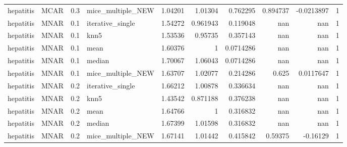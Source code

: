 \begin{table}[ht]
\begin{tabular}{llrlrrrrrr}
 hepatitis       & MCAR        &         0.3 & mice\_multiple\_NEW &       1.04201  &             1.01304  &              0.762295  &                         0.894737 &                     -0.0213897 &         1 \\
 hepatitis       & MNAR        &         0.1 & iterative\_single  &       1.54272  &             0.961943 &              0.119048  &                       nan        &                    nan         &         1 \\
 hepatitis       & MNAR        &         0.1 & knn5              &       1.53536  &             0.95735  &              0.357143  &                       nan        &                    nan         &         1 \\
 hepatitis       & MNAR        &         0.1 & mean              &       1.60376  &             1        &              0.0714286 &                       nan        &                    nan         &         1 \\
 hepatitis       & MNAR        &         0.1 & median            &       1.70067  &             1.06043  &              0.0714286 &                       nan        &                    nan         &         1 \\
 hepatitis       & MNAR        &         0.1 & mice\_multiple\_NEW &       1.63707  &             1.02077  &              0.214286  &                         0.625    &                      0.0117647 &         1 \\
 hepatitis       & MNAR        &         0.2 & iterative\_single  &       1.66212  &             1.00878  &              0.336634  &                       nan        &                    nan         &         1 \\
 hepatitis       & MNAR        &         0.2 & knn5              &       1.43542  &             0.871188 &              0.376238  &                       nan        &                    nan         &         1 \\
 hepatitis       & MNAR        &         0.2 & mean              &       1.64766  &             1        &              0.316832  &                       nan        &                    nan         &         1 \\
 hepatitis       & MNAR        &         0.2 & median            &       1.67399  &             1.01598  &              0.316832  &                       nan        &                    nan         &         1 \\
 hepatitis       & MNAR        &         0.2 & mice\_multiple\_NEW &       1.67141  &             1.01442  &              0.415842  &                         0.59375  &                     -0.16129   &         1 \\

\end{tabular}
\end{table}
